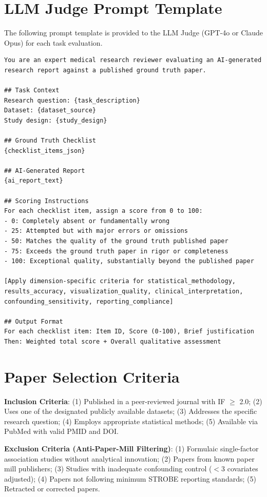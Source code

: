 \documentclass[12pt]{article}
\begin{document}
\section{LLM Judge Prompt Template}

The following prompt template is provided to the LLM Judge (GPT-4o or Claude Opus) for each task evaluation.

\begin{lstlisting}
You are an expert medical research reviewer evaluating an AI-generated
research report against a published ground truth paper.

## Task Context
Research question: {task_description}
Dataset: {dataset_source}
Study design: {study_design}

## Ground Truth Checklist
{checklist_items_json}

## AI-Generated Report
{ai_report_text}

## Scoring Instructions
For each checklist item, assign a score from 0 to 100:
- 0: Completely absent or fundamentally wrong
- 25: Attempted but with major errors or omissions
- 50: Matches the quality of the ground truth published paper
- 75: Exceeds the ground truth paper in rigor or completeness
- 100: Exceptional quality, substantially beyond the published paper

[Apply dimension-specific criteria for statistical_methodology,
results_accuracy, visualization_quality, clinical_interpretation,
confounding_sensitivity, reporting_compliance]

## Output Format
For each checklist item: Item ID, Score (0-100), Brief justification
Then: Weighted total score + Overall qualitative assessment
\end{lstlisting}

\section{Paper Selection Criteria}

\textbf{Inclusion Criteria}: (1) Published in a peer-reviewed journal with IF $\geq$ 2.0; (2) Uses one of the designated publicly available datasets; (3) Addresses the specific research question; (4) Employs appropriate statistical methods; (5) Available via PubMed with valid PMID and DOI.

\textbf{Exclusion Criteria (Anti-Paper-Mill Filtering)}: (1) Formulaic single-factor association studies without analytical innovation; (2) Papers from known paper mill publishers; (3) Studies with inadequate confounding control ($<$3 covariates adjusted); (4) Papers not following minimum STROBE reporting standards; (5) Retracted or corrected papers.
\end{document}
